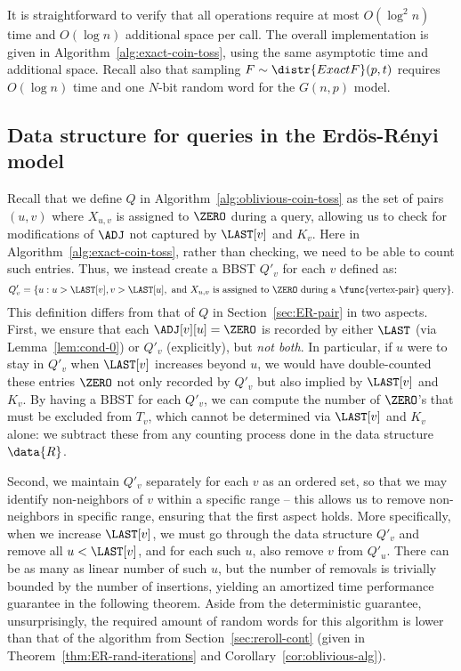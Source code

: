 It is straightforward to verify that all operations require at most $O(\log^2 n)$ time and $O(\log n)$ additional space per call. The overall implementation is given in Algorithm~\ref{alg:exact-coin-toss}, using the same asymptotic time and additional space. Recall also that sampling $F\sim\distr{ExactF}(p,t)$ requires $O(\log n)$ time and one $N$-bit random word for the $G(n,p)$ model.

\subsection{Data structure for  queries in the Erd\"{o}s-R\'{e}nyi model}\label{sec:det-er-pair}
Recall that we define $Q$ in Algorithm~\ref{alg:oblivious-coin-toss} as the  set of pairs $(u,v)$ where $X_{u,v}$ is assigned to $\ZERO$ during a  query, allowing us to check for modifications of $\ADJ$ not captured by $\LAST[v]$ and $K_v$. Here in Algorithm~\ref{alg:exact-coin-toss}, rather than checking, we need to be able to count such entries. Thus, we instead create a BBST $Q'_v$ for each $v$ defined as:
\[Q'_v = \{u: u > \LAST[v], v > \LAST[u], \textrm{ and } X_{u,v}\textrm{ is assigned to }\ZERO \textrm{ during a \func{vertex-pair} query}\}.\]
This definition differs from that of $Q$ in Section~\ref{sec:ER-pair} in two aspects. First, we ensure that each $\ADJ[v][u] = \ZERO$ is recorded by either $\LAST$ (via Lemma~\ref{lem:cond-0}) or $Q'_v$ (explicitly), but \emph{not both}. In particular, if $u$ were to stay in $Q'_v$ when $\LAST[v]$ increases beyond $u$, we would have double-counted these entries $\ZERO$ not only recorded by $Q'_v$ but also implied by $\LAST[v]$ and $K_v$. By having a BBST for each $Q'_v$, we can compute the number of $\ZERO$'s that must be excluded from $T_v$, which cannot be determined via $\LAST[v]$ and $K_v$ alone: we subtract these from any counting process done in the data structure $\data{R}$.

Second, we maintain $Q'_v$ separately for each $v$ as an ordered set, so that we may identify non-neighbors of $v$ within a specific range -- this allows us to remove non-neighbors in specific range, ensuring that the first aspect holds. More specifically, when we increase $\LAST[v]$, we must go through the data structure $Q'_v$ and remove all $u < \LAST[v]$, and for each such $u$, also remove $v$ from $Q'_u$. There can be as many as linear number of such $u$, but the number of removals is trivially bounded by the number of insertions, yielding an amortized time performance guarantee in the following theorem. Aside from the deterministic guarantee, unsurprisingly, the required amount of random words for this algorithm is lower than that of the algorithm from Section~\ref{sec:reroll-cont} (given in Theorem~\ref{thm:ER-rand-iterations} and Corollary~\ref{cor:oblivious-alg}).

